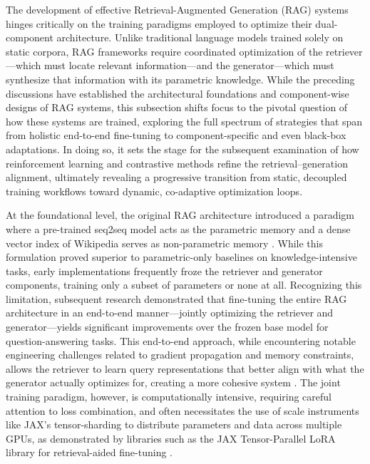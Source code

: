 \documentclass[11pt]{article}
\begin{document}
The development of effective Retrieval-Augmented Generation (RAG) systems hinges critically on the training paradigms employed to optimize their dual-component architecture. Unlike traditional language models trained solely on static corpora, RAG frameworks require coordinated optimization of the retriever---which must locate relevant information---and the generator---which must synthesize that information with its parametric knowledge. While the preceding discussions have established the architectural foundations and component-wise designs of RAG systems, this subsection shifts focus to the pivotal question of how these systems are trained, exploring the full spectrum of strategies that span from holistic end-to-end fine-tuning to component-specific and even black-box adaptations. In doing so, it sets the stage for the subsequent examination of how reinforcement learning and contrastive methods refine the retrieval--generation alignment, ultimately revealing a progressive transition from static, decoupled training workflows toward dynamic, co-adaptive optimization loops.

At the foundational level, the original RAG architecture introduced a paradigm where a pre-trained seq2seq model acts as the parametric memory and a dense vector index of Wikipedia serves as non-parametric memory \cite{ref73}. While this formulation proved superior to parametric-only baselines on knowledge-intensive tasks, early implementations frequently froze the retriever and generator components, training only a subset of parameters or none at all. Recognizing this limitation, subsequent research demonstrated that fine-tuning the entire RAG architecture in an end-to-end manner---jointly optimizing the retriever and generator---yields significant improvements over the frozen base model for question-answering tasks. This end-to-end approach, while encountering notable engineering challenges related to gradient propagation and memory constraints, allows the retriever to learn query representations that better align with what the generator actually optimizes for, creating a more cohesive system \cite{ref6}. The joint training paradigm, however, is computationally intensive, requiring careful attention to loss combination, and often necessitates the use of scale instruments like JAX's tensor-sharding to distribute parameters and data across multiple GPUs, as demonstrated by libraries such as the JAX Tensor-Parallel LoRA library for retrieval-aided fine-tuning \cite{ref60}.
\end{document}
